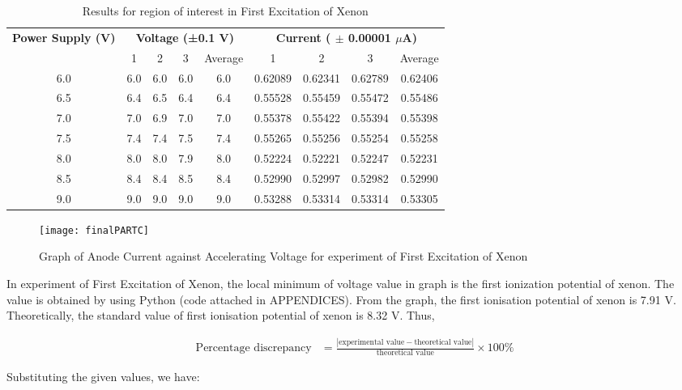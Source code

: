 \documentclass[a4paper,11pt]{article}
\begin{document}
\begin{table}[h!]
\small
\centering
\begin{tabular}{ccccccccc}
\toprule
\multicolumn{1}{c}{\textbf{Power Supply (V)}} & \multicolumn{4}{c}{\textbf{Voltage (±0.1 V)}} & \multicolumn{4}{c}{\textbf{Current ( $\pm$ 0.00001 $\mu$A)}} \\
\cmidrule(lr){2-5} \cmidrule(lr){6-9}
& 1 & 2 & 3 & Average & 1 & 2 & 3 & Average \\
\midrule
6.0 & 6.0 & 6.0 & 6.0 & 6.0 & 0.62089 & 0.62341 & 0.62789 & 0.62406 \\
6.5 & 6.4 & 6.5 & 6.4 & 6.4 & 0.55528 & 0.55459 & 0.55472 & 0.55486 \\
7.0 & 7.0 & 6.9 & 7.0 & 7.0 & 0.55378 & 0.55422 & 0.55394 & 0.55398 \\
7.5 & 7.4 & 7.4 & 7.5 & 7.4 & 0.55265 & 0.55256 & 0.55254 & 0.55258 \\
8.0 & 8.0 & 8.0 & 7.9 & 8.0 & 0.52224 & 0.52221 & 0.52247 & 0.52231 \\
8.5 & 8.4 & 8.4 & 8.5 & 8.4 & 0.52990 & 0.52997 & 0.52982 & 0.52990 \\
9.0 & 9.0 & 9.0 & 9.0 & 9.0 & 0.53288 & 0.53314 & 0.53314 & 0.53305 \\
\hline
\end{tabular}
\caption{Results for region of interest in First Excitation of Xenon}
\label{table:measurements}
\end{table}

\newpage
\begin{figure}[h!]
\centering
\texttt{[image: finalPARTC]}
\caption{Graph of Anode Current against Accelerating Voltage for experiment of First Excitation of Xenon}
\label{3}
\end{figure}


In experiment of First Excitation of Xenon, the local minimum of voltage value in graph is the first ionization potential of xenon. The value is obtained by using Python (code attached in APPENDICES).
From the graph, the first ionisation potential of xenon is 7.91 V.
Theoretically, the standard value of first ionisation potential of xenon is 8.32 V.
Thus,

\begin{align*}
\text{Percentage discrepancy} &= \frac{|\text{experimental value} - \text{theoretical value}|}{\text{theoretical value}} \times 100\%
\end{align*}

Substituting the given values, we have:
\end{document}
